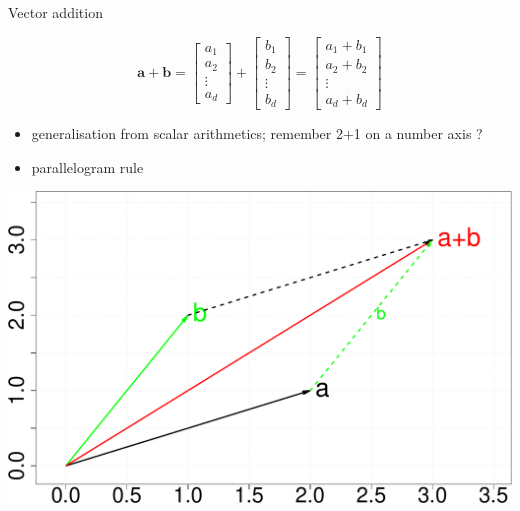\documentclass[ignorenonframetext,]{beamer}
\providecommand{\tightlist}{%
  \setlength{\itemsep}{0pt}\setlength{\parskip}{0pt}}
\newcommand{\vv}[1]{\boldsymbol{#1}}
\begin{document}
\begin{frame}{Vector addition}
\protect\hypertarget{vector-addition}{}

\[\vv{a}+\vv{b} = \begin{bmatrix}
           a_1 \\
           a_2 \\
           \vdots\\
           a_d
         \end{bmatrix} +  \begin{bmatrix}
           b_1 \\
           b_2 \\
           \vdots\\
           b_d
         \end{bmatrix} = \begin{bmatrix}
           a_1+b_1 \\
           a_2+b_2 \\
           \vdots\\
           a_d+b_d
         \end{bmatrix}\]

\begin{itemize}
\tightlist
\item
  generalisation from scalar arithmetics; remember 2+1 on a number axis
  ?
\item
  parallelogram rule \bigskip
\end{itemize}

\begin{center}\includegraphics[width=0.55\linewidth]{math4ml_files/figure-beamer/unnamed-chunk-3-1} \end{center}

\end{frame}
\end{document}
